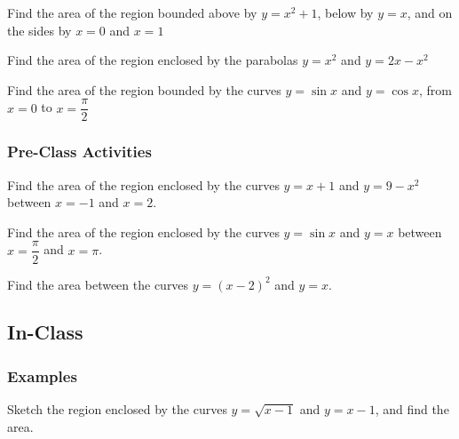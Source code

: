 \documentclass[notes]{subfiles}
\begin{document}
		\begin{ex}
			Find the area of the region bounded above by $y = x^2+1$, below by $y = x$, and on the sides by $x = 0$ and $x = 1$
		\end{ex}
			\newpage
			
		\begin{ex}
			Find the area of the region enclosed by the parabolas $y = x^2$ and $y = 2x-x^2$
		\end{ex}

			
		\begin{ex}
			Find the area of the region bounded by the curves $y = \sin x$ and $y = \cos x$, from $x = 0$ to $x = \dfrac{\pi}{2}$
		\end{ex}
			\newpage
	
	\subsubsection*{Pre-Class Activities}
		\begin{ex}
			Find the area of the region enclosed by the curves $y = x+1$ and $y = 9-x^2$ between $x = -1$ and $x=2$.
		\end{ex}
			
		\begin{ex}
			Find the area of the region enclosed by the curves $y = \sin x$ and $y = x$ between $x = \dfrac{\pi}{2}$ and $x = \pi$.
		\end{ex}
			
		\begin{ex}
			Find the area between the curves $y = (x-2)^2$ and $y = x$.
		\end{ex}
			\newpage
			
	\subsection*{In-Class}
	\subsubsection*{Examples}
		
		\begin{ex}
			Sketch the region enclosed by the curves $y = \sqrt{x-1}$ and $y=x-1$, and find the area.
		\end{ex}
			
\end{document}
